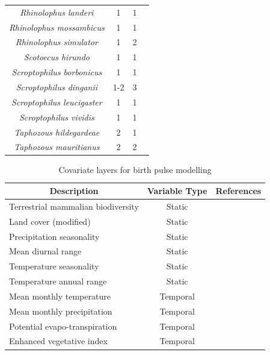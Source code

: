\documentclass[9pt,twoside,lineno]{pnas-new}
\begin{document}
\begin{longtable}{cccp{5cm}}
\textit{Rhinolophus landeri} & 1 & 1 & \cite{Menzies1973ANigeria}\\
\textit{Rhinolophus mossambicus} & 1 & 1 & \cite{Cotterill1998FemaleZimbabwe}\\
\textit{Rhinolophus simulator} & 1 & 2 & \cite{Cotterill1998FemaleZimbabwe,OShea1980EcologicalCommunity}\\
\textit{Scotoecus hirundo} & 1 & 1 & \cite{OShea1980EcologicalCommunity}\\
\textit{Scroptophilus borbonicus} & 1 & 1 & \cite{VanderMerweN.J.Rautenbach1988AVespertilionidae}\\
\textit{Scroptophilus dinganii} & 1-2 & 3 & \cite{OShea1980EcologicalCommunity,vanderMerwe2006Aspects1833,Okia1987ReproductiveBats}\\
\textit{Scroptophilus leucigaster} & 1 & 1 & \cite{Barclay1985NoLeucogastere}\\
\textit{Scroptophilus vividis} & 1 & 1 & \cite{VanderMerweN.J.Rautenbach1988AVespertilionidae}\\
\textit{Taphozous hildegardeae} & 2 & 1 & \cite{McWilliam1988TheTropics}\\
\textit{Taphozous mauritianus} & 2 & 2 & \cite{Happold1990ReproductiveAfrica,OShea1980EcologicalCommunity}\\
\end{longtable}
\FloatBarrier

\begin{table}
\centering
\caption{Covariate layers for birth pulse modelling}
\label{table:ENM_CoV}
\begin{tabular}{l c r}
\multicolumn{1}{c}{Description} & \multicolumn{1}{c}{Variable Type} & \multicolumn{1}{c}{References}\\
\hline\hline
Terrestrial mammalian biodiversity & Static & \cite{IUCN2016TerrestrialData}\\
Land cover (modified) & Static & \cite{Olivier2012Global2009}\\
Precipitation seasonality & Static & \cite{Frick2017WorldclimArease}\\
Mean diurnal range & Static & \cite{Frick2017WorldclimArease}\\
Temperature seasonality & Static & \cite{Frick2017WorldclimArease}\\
Temperature annual range & Static& \cite{Frick2017WorldclimArease}\\
Mean monthly temperature & Temporal & \cite{Frick2017WorldclimArease}\\
Mean monthly precipitation & Temporal & \cite{Frick2017WorldclimArease}\\
Potential evapo-transpiration & Temporal & \cite{Trabucco2009GlobalDatabase}\\
Enhanced vegetative index & Temporal & \cite{Huete2002OverviewIndices}
\end{tabular}
\end{table}
\FloatBarrier
\end{document}
